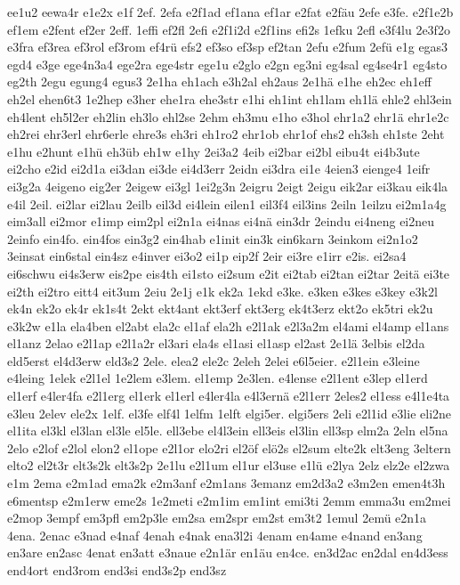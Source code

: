 {ee1u2
eewa4r
e1e2x
e1f
2ef.
2efa
e2f1ad
ef1ana
ef1ar
e2fat
e2fäu
2efe
e3fe.
e2f1e2b
ef1em
e2fent
ef2er
2eff.
1effi
ef2fl
2efi
e2f1i2d
e2f1ins
efi2s
1efku
2efl
e3f4lu
2e3f2o
e3fra
ef3rea
ef3rol
ef3rom
ef4rü
efs2
ef3so
ef3sp
ef2tan
2efu
e2fum
2efü
e1g
egas3
egd4
e3ge
ege4n3a4
ege2ra
ege4str
ege1u
e2glo
e2gn
eg3ni
eg4sal
eg4se4r1
eg4sto
eg2th
2egu
egung4
egus3
2e1ha
eh1ach
e3h2al
eh2aus
2e1hä
e1he
eh2ec
eh1eff
eh2el
ehen6t3
1e2hep
e3her
ehe1ra
ehe3str
e1hi
eh1int
eh1lam
eh1lä
ehle2
ehl3ein
eh4lent
eh5l2er
eh2lin
eh3lo
ehl2se
2ehm
eh3mu
e1ho
e3hol
ehr1a2
ehr1ä
ehr1e2c
eh2rei
ehr3erl
ehr6erle
ehre3s
eh3ri
eh1ro2
ehr1ob
ehr1of
ehs2
eh3sh
eh1ste
2eht
e1hu
e2hunt
e1hü
eh3üb
eh1w
e1hy
2ei3a2
4eib
ei2bar
ei2bl
eibu4t
ei4b3ute
ei2cho
e2id
ei2d1a
ei3dan
ei3de
ei4d3err
2eidn
ei3dra
ei1e
4eien3
eienge4
1eifr
ei3g2a
4eigeno
eig2er
2eigew
ei3gl
1ei2g3n
2eigru
2eigt
2eigu
eik2ar
ei3kau
eik4la
e4il
2eil.
ei2lar
ei2lau
2eilb
eil3d
ei4lein
eilen1
eil3f4
eil3ins
2eiln
1eilzu
ei2m1a4g
eim3all
ei2mor
e1imp
eim2pl
ei2n1a
ei4nas
ei4nä
ein3dr
2eindu
ei4neng
ei2neu
2einfo
ein4fo.
ein4fos
ein3g2
ein4hab
e1init
ein3k
ein6karn
3einkom
ei2n1o2
3einsat
ein6stal
ein4sz
e4inver
ei3o2
ei1p
eip2f
2eir
ei3re
e1irr
e2is.
ei2sa4
ei6schwu
ei4s3erw
eis2pe
eis4th
ei1sto
ei2sum
e2it
ei2tab
ei2tan
ei2tar
2eitä
ei3te
ei2th
ei2tro
eitt4
eit3um
2eiu
2e1j
e1k
ek2a
1ekd
e3ke.
e3ken
e3kes
e3key
e3k2l
ek4n
ek2o
ek4r
ek1s4t
2ekt
ekt4ant
ekt3erf
ekt3erg
ek4t3erz
ekt2o
ek5tri
ek2u
e3k2w
e1la
ela4ben
el2abt
ela2c
el1af
ela2h
e2l1ak
e2l3a2m
el4ami
el4amp
el1ans
el1anz
2elao
e2l1ap
e2l1a2r
el3ari
ela4s
el1asi
el1asp
el2ast
2e1lä
3elbis
el2da
eld5erst
el4d3erw
eld3s2
2ele.
elea2
ele2c
2eleh
2elei
e6l5eier.
e2l1ein
e3leine
e4leing
1elek
e2l1el
1e2lem
e3lem.
el1emp
2e3len.
e4lense
e2l1ent
e3lep
el1erd
el1erf
e4ler4fa
e2l1erg
el1erk
el1erl
e4ler4la
e4l3ernä
e2l1err
2eles2
el1ess
e4l1e4ta
e3leu
2elev
ele2x
1elf.
el3fe
elf4l
1elfm
1elft
elgi5er.
elgi5ers
2eli
e2l1id
e3lie
eli2ne
el1ita
el3kl
el3lan
el3le
el5le.
ell3ebe
el4l3ein
ell3eis
el3lin
ell3sp
elm2a
2eln
el5na
2elo
e2lof
e2lol
elon2
el1ope
e2l1or
elo2ri
el2öf
elö2s
el2sum
elte2k
elt3eng
3eltern
elto2
el2t3r
elt3s2k
elt3s2p
2e1lu
e2l1um
el1ur
el3use
e1lü
e2lya
2elz
elz2e
el2zwa
e1m
2ema
e2m1ad
ema2k
e2m3anf
e2m1ans
3emanz
em2d3a2
e3m2en
emen4t3h
e6mentsp
e2m1erw
eme2s
1e2meti
e2m1im
em1int
emi3ti
2emm
emma3u
em2mei
e2mop
3empf
em3pfl
em2p3le
em2sa
em2spr
em2st
em3t2
1emul
2emü
e2n1a
4ena.
2enac
e3nad
e4naf
4enah
e4nak
ena3l2i
4enam
en4ame
e4nand
en3ang
en3are
en2asc
4enat
en3att
e3naue
e2n1är
en1äu
en4ce.
en3d2ac
en2dal
en4d3ess
end4ort
end3rom
end3si
end3s2p
end3sz
}
